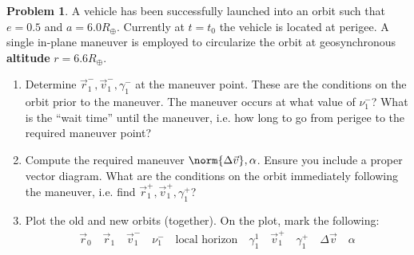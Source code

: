 \documentclass[10pt]{article}
\theoremstyle{definition}
\newtheorem{prob}{Problem}[section]
\newenvironment{subprob}%
{\renewcommand{\theenumi}{\alph{enumi}}\renewcommand{\labelenumi}{(\theenumi)}\begin{enumerate}}%
{\end{enumerate}}%
\begin{document}
\begin{prob}
    A vehicle has been successfully launched into an orbit such that \( e = 0.5 \) and \( a = 6.0 R_{\oplus} \). 
    Currently at \( t = t_0 \) the vehicle is located at perigee.
    A single in-plane maneuver is employed to circularize the orbit at geosynchronous \textbf{altitude} \( r = 6.6 R_{\oplus} \).
    \begin{subprob}
    \item Determine \( \vec r_1^{-} , \vec v_1^{-}, \gamma_1^{-} \)  at the maneuver point.
        These are the conditions on the orbit prior to the maneuver.
        The maneuver occurs at what value of \( \nu_1^{-} \)?
        What is the ``wait time'' until the maneuver, i.e. how long to go from perigee to the required maneuver point?
    \item Compute the required maneuver \( \norm{\Delta \vec v}, \alpha \).
        Ensure you include a proper vector diagram.
        What are the conditions on the orbit immediately following the maneuver, i.e. find \( \vec r_1^{+} , \vec v_1^{+}, \gamma_1^{+} \)?
    \item Plot the old and new orbits (together).
        On the plot, mark the following:
        \begin{align*}
            \vec r_0 \quad \vec r_1 \quad \vec v_1^{-} \quad \nu_1^{-} \quad \text{local horizon} \quad \gamma_1^{1} \quad \vec v_1^{+} \quad \gamma_1^{+} \quad \Delta \vec v \quad \alpha 
        \end{align*}
    \end{subprob}
\end{prob}
\end{document}
